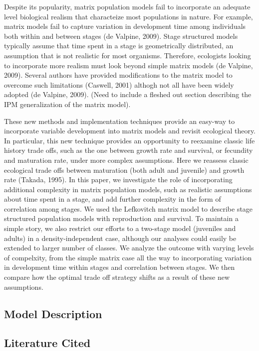 \documentclass[]{article}
\begin{document}
Despite its popularity, matrix population models fail to incorporate an
adequate level biological realism that characteize most populations in
nature. For example, matrix models fail to capture variation in
development time among individuals both within and between stages (de
Valpine, 2009). Stage structured models typically assume that time spent
in a stage is geometrically distributed, an assumption that is not
realistic for most organisms. Therefore, ecologists looking to
incorporate more realism must look beyond simple matrix models (de
Valpine, 2009). Several authors have provided modifications to the
matrix model to overcome such limitations (Caswell, 2001) althogh not
all have been widely adopted (de Valpine, 2009). (Need to include a
fleshed out section describing the IPM generalization of the matrix
model).

These new methods and implementation techniques provide an easy-way to
incorporate variable development into matrix models and revisit
ecological theory. In particular, this new technique provides an
opportunity to reexamine classic life history trade offs, such as the
one between growth rate and survival, or fecundity and maturation rate,
under more complex assumptions. Here we reassess classic ecological
trade offs between maturation (both adult and juvenile) and growth rate
(Takada, 1995). In this paper, we investigate the role of incorporating
additional complexity in matrix population models, such as realistic
assumptions about time spent in a stage, and add further complexity in
the form of correlation among stages. We used the Lefkovitch matrix
model to describe stage structured population models with reproduction
and survival. To maintain a simple story, we also restrict our efforts
to a two-stage model (juveniles and adults) in a density-independent
case, although our analyses could easily be extended to larger number of
classes. We analyze the outcome with varying levels of compelxity, from
the simple matrix case all the way to incorporating variation in
development time within stages and correlation between stages. We then
compare how the optimal trade off strategy shifts as a result of these
new assumptions.

\subsection{Model Description}

\subsection{Literature Cited}
\end{document}

